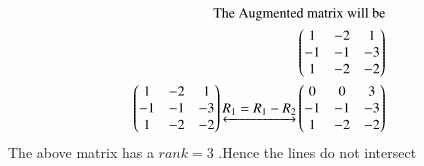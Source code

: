 \documentclass[journal,12pt,twocolumn]{IEEEtran}
\begin{document}
\begin{align}
    \text{The Augmented matrix will be}\notag\\
    \begin{pmatrix}1 & -2 & 1\\-1 & -1 & -3\\1 & -2 & -2\end{pmatrix}\notag\\
    \begin{pmatrix}1 & -2 & 1\\-1 & -1 & -3\\1 & -2 & -2\end{pmatrix}\underleftrightarrow{R_1=R_1-R_2}\begin{pmatrix}0 & 0 & 3\\-1 & -1 & -3\\1 & -2 & -2\end{pmatrix}\notag
\end{align}
The above matrix has a $rank=3$ .Hence the lines do not intersect
\end{document}
